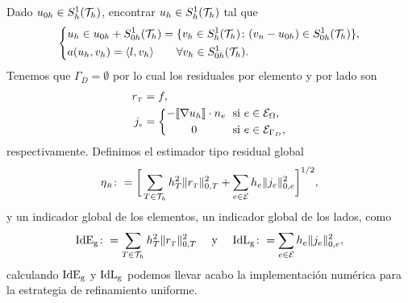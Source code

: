 Dado  $u_{0h}\in S^{1}_{h}({\mathcal{T}}_{h})$, encontrar $u_{h}\in S^{1}_{h}({\mathcal{T}}_{h})$ tal que 
\begin{equation}
\left\{
\begin{aligned}
&u_{h} \in u_{0h} + S^{1}_{0h}({\mathcal{T}}_{h})=\{ v_{h}\in S^{1}_{h}({\mathcal{T}}_{h}) \colon (v_{n}-u_{0h})\in S^{1}_{0h}({\mathcal{T}}_{h}) \},\\
&a(u_{h},v_{h})=\langle l,v_{h} \rangle \qquad \forall v_{h}\in S^{1}_{0h}({\mathcal{T}}_{h}).
\end{aligned}
\right.
\end{equation}
Tenemos que $\Gamma_{D}=\emptyset$ por lo cual los residuales por elemento y por lado son 
\begin{equation*}
\begin{split}
r_{\text{\tiny $T$}} & = f, \\
j_{\text{\tiny $e$}} &= \left\{ 
\begin{aligned}
- \llbracket \nabla u_{h} \rrbracket\cdot n_{e} \hspace{0.1cm} &\text{ si } e\in {\ensuremath{\mathcal{E}}}_{ \Omega},\\
0\hspace{1cm} &\text{ si } e\in{\ensuremath{\mathcal{E}}}_{ \Gamma_{D}},
\end{aligned}
\right.
\end{split}
\end{equation*}
respectivamente. Definimos el estimador tipo residual global 
\begin{equation}
\eta_{\text{\tiny $R$}} \colon =\bigg[ \sum_{T\in{\ensuremath{\mathcal{T}}}_{h}} h^{2}_{T}\| r_{\text{\tiny $T$}} \|^{2}_{0,T}  + \sum_{e\in {\ensuremath{\mathcal{E}}}} h_{e}\|j_{e}\|^{2}_{0,e}  \bigg]^{1/2},
\end{equation}
y un indicador global de los elementos, un indicador global de los lados, como 
\begin{equation*}
\begin{split}
{\rm IdE_{g}}\colon = \sum_{T\in{\ensuremath{\mathcal{T}}}_{h}} h^{2}_{T}\| r_{\text{\tiny $T$}} \|^{2}_{0,T} \quad\text{ y }\quad {\rm IdL_{g}}\colon = \sum_{e\in {\ensuremath{\mathcal{E}}}} h_{e}\|j_{e}\|^{2}_{0,e},
\end{split}
\end{equation*}
calculando ${\rm IdE_{g}}$ y ${\rm IdL_{g}}$ podemos llevar acabo la implementaci\'on num\'erica para la estrategia de refinamiento uniforme. 

